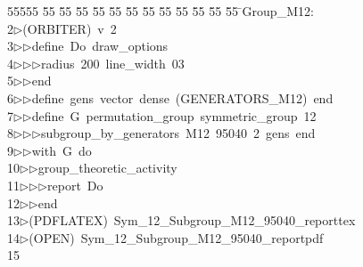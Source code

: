 %
%
\begin{tabbing}
55555 \= 55 \= 55 \= 55 \= 55 \= 55 \= 55 \= 55 \= 55 \= 55 \= 55 \= 55 \= 55 \= \>Group\_M12:\\[0pt]
2\>$\triangleright$\>(ORBITER)\ v\ 2\ \\[0pt]
3\>$\triangleright$\>$\triangleright$\>define\ Do\ draw\_options\ \\[0pt]
4\>$\triangleright$\>$\triangleright$\>$\triangleright$\>radius\ 200\ line\_width\ 03\ \\[0pt]
5\>$\triangleright$\>$\triangleright$\>end\ \\[0pt]
6\>$\triangleright$\>$\triangleright$\>define\ gens\ vector\ dense\ (GENERATORS\_M12)\ end\ \\[0pt]
7\>$\triangleright$\>$\triangleright$\>define\ G\ permutation\_group\ symmetric\_group\ 12\ \\[0pt]
8\>$\triangleright$\>$\triangleright$\>$\triangleright$\>subgroup\_by\_generators\ M12\ 95040\ 2\ gens\ end\ \\[0pt]
9\>$\triangleright$\>$\triangleright$\>with\ G\ do\ \\[0pt]
10\>$\triangleright$\>$\triangleright$\>group\_theoretic\_activity\ \\[0pt]
11\>$\triangleright$\>$\triangleright$\>$\triangleright$\>report\ Do\ \\[0pt]
12\>$\triangleright$\>$\triangleright$\>end\\[0pt]
13\>$\triangleright$\>(PDFLATEX)\ Sym\_12\_Subgroup\_M12\_95040\_reporttex\\[0pt]
14\>$\triangleright$\>(OPEN)\ Sym\_12\_Subgroup\_M12\_95040\_reportpdf\\[0pt]
15\>\end{tabbing}
